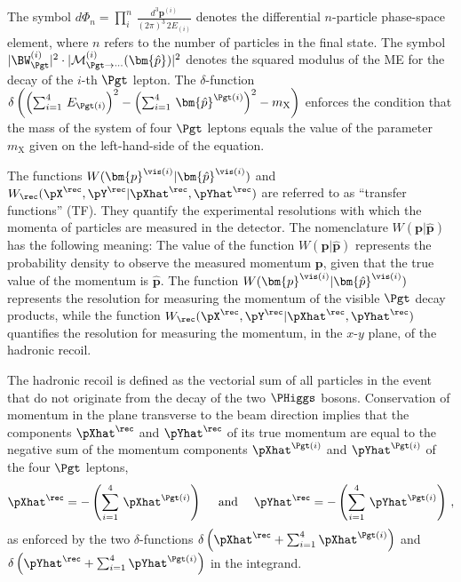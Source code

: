 The symbol $d\Phi_{n} = \prod_{i}^{n} \,
\frac{d^{3}\bm{p}^{(i)}}{(2\pi)^{3} \, 2 E_{(i)}}$ denotes the differential $n$-particle phase-space element,
where $n$ refers to the number of particles in the final state.
The symbol $\vert \BW^{(i)}_{\Pgt} \vert^{2} \cdot \vert \mathcal{M}^{(i)}_{\Pgt\to\cdots}(\bm{\hat{p}}) \vert^{2}$ 
denotes the squared modulus of the ME for the decay of the $i$-th $\Pgt$ lepton.
The $\delta$-function 
$\delta\left( \left(\sum_{i=1}^{4} \, E_{\Pgt(i)}\right)^{2} - \left(\sum_{i=1}^{4} \, \bm{\hat{p}}^{\Pgt(i)}\right)^{2} - m_{\textrm{X}} \right)$
enforces the condition that the mass of the system of four $\Pgt$ leptons equals the value of the parameter $m_{\textrm{X}}$
given on the left-hand-side of the equation.

The functions $W(\bm{p}^{\vis(i)}|\bm{\hat{p}}^{\vis(i)})$ and $W_{\rec}( \pX^{\rec},\pY^{\rec} | \pXhat^{\rec},\pYhat^{\rec} )$ are referred to as ``transfer functions'' (TF).
They quantify the experimental resolutions with which the momenta of particles are measured in the detector.
The nomenclature $W(\bm{p}|\bm{\hat{p}})$ has the following meaning:
The value of the function $W(\bm{p}|\bm{\hat{p}})$ represents the probability density to observe the measured momentum $\bm{p}$,
given that the true value of the momentum is $\bm{\hat{p}}$.
The function $W(\bm{p}^{\vis(i)}|\bm{\hat{p}}^{\vis(i)})$ represents the resolution for measuring the momentum of the visible $\Pgt$ decay products,
while the function $W_{\rec}( \pX^{\rec},\pY^{\rec} | \pXhat^{\rec},\pYhat^{\rec} )$ quantifies the resolution for measuring the momentum, 
in the $x$-$y$ plane, of the hadronic recoil.

The hadronic recoil is defined as the vectorial sum of all particles in the event that do not originate from the decay of the two $\PHiggs$ bosons.
Conservation of momentum in the plane transverse to the beam direction implies that
the components $\pXhat^{\rec}$ and $\pYhat^{\rec}$ of its true momentum are equal to the negative sum of the momentum components
$\pXhat^{\Pgt(i)}$ and $\pYhat^{\Pgt(i)}$ of the four $\Pgt$ leptons,
\begin{equation*}
\pXhat^{\rec} = -\left( \sum_{i=1}^{4} \, \pXhat^{\Pgt(i)} \right) \quad \mbox{ and } \quad \pYhat^{\rec} = -\left( \sum_{i=1}^{4} \, \pYhat^{\Pgt(i)} \right) \, ,
\end{equation*}
as enforced by the two $\delta$-functions
$\delta\left( \pXhat^{\rec} + \sum_{i=1}^{4} \pXhat^{\Pgt(i)} \right)$ and $\delta\left( \pYhat^{\rec} + \sum_{i=1}^{4} \pYhat^{\Pgt(i)} \right)$
in the integrand.

